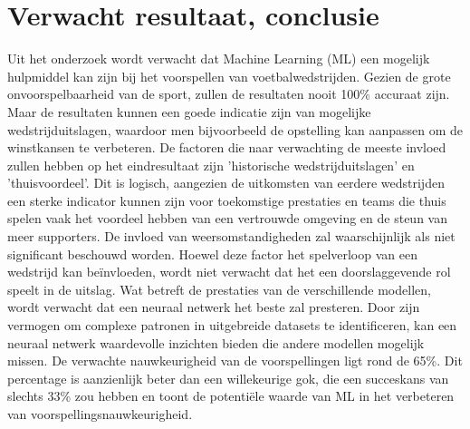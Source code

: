 \section{Verwacht resultaat, conclusie}%
\label{sec:verwachte_resultaten}

Uit het onderzoek wordt verwacht dat Machine Learning (ML) een mogelijk hulpmiddel kan zijn bij het voorspellen van voetbalwedstrijden. Gezien de grote onvoorspelbaarheid van de sport, zullen de resultaten nooit 100\% accuraat zijn. Maar de resultaten kunnen een goede indicatie zijn van mogelijke wedstrijduitslagen, waardoor men bijvoorbeeld de opstelling kan aanpassen om de winstkansen te verbeteren.
De factoren die naar verwachting de meeste invloed zullen hebben op het eindresultaat zijn 'historische wedstrijduitslagen' en 'thuisvoordeel'. Dit is logisch, aangezien de uitkomsten van eerdere wedstrijden een sterke indicator kunnen zijn voor toekomstige prestaties en teams die thuis spelen vaak het voordeel hebben van een vertrouwde omgeving en de steun van meer supporters.
De invloed van weersomstandigheden zal waarschijnlijk als niet significant beschouwd worden. Hoewel deze factor het spelverloop van een wedstrijd kan beïnvloeden, wordt niet verwacht dat het een doorslaggevende rol speelt in de uitslag.
Wat betreft de prestaties van de verschillende modellen, wordt verwacht dat een neuraal netwerk het beste zal presteren. Door zijn vermogen om complexe patronen in uitgebreide datasets te identificeren, kan een neuraal netwerk waardevolle inzichten bieden die andere modellen mogelijk missen.
De verwachte nauwkeurigheid van de voorspellingen ligt rond de 65\%. Dit percentage is aanzienlijk beter dan een willekeurige gok, die een succeskans van slechts 33\% zou hebben en toont de potentiële waarde van ML in het verbeteren van voorspellingsnauwkeurigheid.
